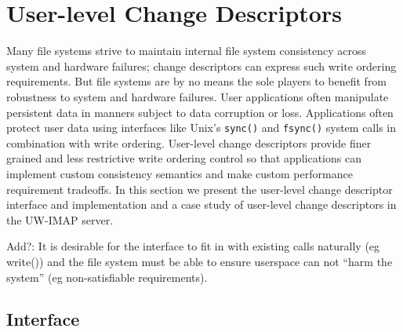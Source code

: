 \section{User-level Change Descriptors}
\label{sec:opgroup}

Many file systems strive to maintain internal file system consistency
across system and hardware failures; change descriptors can express
such write ordering requirements. But file systems are by no means the
sole players to benefit from robustness to system and hardware
failures. User applications often manipulate persistent data in
manners subject to data corruption or loss. Applications often protect
user data using interfaces like Unix's \texttt{sync()} and
\texttt{fsync()} system calls in combination with write ordering.
User-level change descriptors provide finer grained and less
restrictive write ordering control so that applications can implement
custom consistency semantics and make custom performance requirement
tradeoffs. In this section we present the user-level change descriptor
interface and implementation and a case study of user-level change
descriptors in the UW-IMAP server.

Add?: It is desirable for the interface to fit in with existing calls
naturally (eg write()) and the file system must be able to ensure
userspace can not ``harm the system'' (eg non-satisfiable
requirements).

\subsection{Interface}

